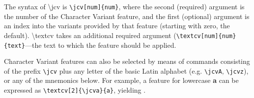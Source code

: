 The syntax of \textbackslash jcv
is {\color{BrickRed}\verb|\jcv[num]{num}|}, where the second (required) argument is the number of the Character Variant feature,
and the first (optional) argument is an index into the variants provided by that feature (starting with zero, the default).
\textbackslash textcv takes an additional required argument ({\color{BrickRed}\verb|\textcv[num]{num}{text}|}---the text to which the
feature should be applied.

Character Variant features can also be selected by means of commands consisting of the prefix
{\color{BrickRed}\verb|\jcv|} plus any letter of the basic Latin alphabet (e.g. {\color{BrickRed}\verb|\jcvA|},
{\color{BrickRed}\verb|\jcvz|}), or any of the mnemonics below.
For example, a feature for
lowercase \textbf{a} can be expressed as {\color{BrickRed}\verb|\textcv[2]{\jcva}{a}|}, yielding \textbf{}.

